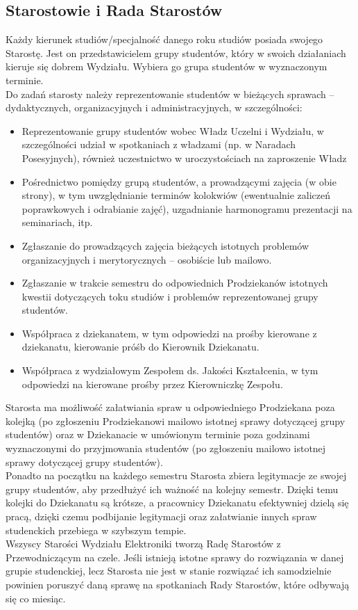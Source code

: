 \documentclass[11pt]{article}
\begin{document}
\subsection{Starostowie i Rada Starostów}
\indent \hspace{0.5cm} Każdy kierunek studiów/specjalność danego roku studiów posiada swojego Starostę. \linebreak Jest on przedstawicielem grupy studentów, który w swoich działaniach kieruje się dobrem Wydziału. Wybiera go grupa studentów w wyznaczonym terminie.\\
\indent Do zadań starosty należy reprezentowanie studentów w bieżących sprawach – dydaktycznych, organizacyjnych i administracyjnych, w szczególności:
\begin{itemize}
    \item Reprezentowanie grupy studentów wobec Władz Uczelni i Wydziału, w szczególności udział w spotkaniach z władzami (np. w Naradach Posesyjnych), również uczestnictwo w uroczystościach na zaproszenie Władz
    \item Pośrednictwo pomiędzy grupą studentów, a prowadzącymi zajęcia (w obie strony), w tym uwzględnianie terminów kolokwiów (ewentualnie zaliczeń poprawkowych i odrabianie zajęć), uzgadnianie harmonogramu prezentacji na seminariach, itp.
    \item Zgłaszanie do prowadzących zajęcia bieżących istotnych problemów organizacyjnych i merytorycznych – osobiście lub mailowo.
    \item Zgłaszanie w trakcie semestru do odpowiednich Prodziekanów istotnych kwestii dotyczących toku studiów i problemów reprezentowanej grupy studentów.
    \item Współpraca z dziekanatem, w tym odpowiedzi na prośby kierowane z dziekanatu, kierowanie próśb do Kierownik Dziekanatu.
    \item Współpraca z wydziałowym Zespołem ds. Jakości Kształcenia, w tym odpowiedzi na kierowane prośby przez Kierowniczkę Zespołu.
\end{itemize}
\indent \hspace{0.5cm} Starosta ma możliwość załatwiania spraw u odpowiedniego Prodziekana poza kolejką (po zgłoszeniu Prodziekanowi mailowo istotnej sprawy dotyczącej grupy studentów) oraz w Dziekanacie w umówionym terminie poza godzinami wyznaczonymi do przyjmowania studentów (po zgłoszeniu mailowo istotnej sprawy dotyczącej grupy studentów).\\
\indent Ponadto na początku na każdego semestru Starosta zbiera legitymacje ze swojej grupy studentów, aby przedłużyć ich ważność na kolejny semestr. Dzięki temu kolejki do Dziekanatu są krótsze, a pracownicy Dziekanatu efektywniej dzielą się pracą, dzięki czemu podbijanie legitymacji oraz załatwianie innych spraw studenckich przebiega w szybszym tempie.\\
\indent Wszyscy Starości Wydziału Elektroniki tworzą Radę Starostów z Przewodniczącym na czele. Jeśli istnieją istotne sprawy do rozwiązania w danej grupie studenckiej, lecz Starosta nie jest w stanie rozwiązać ich samodzielnie powinien poruszyć daną sprawę na spotkaniach Rady Starostów, które odbywają się co miesiąc.
\end{document}
